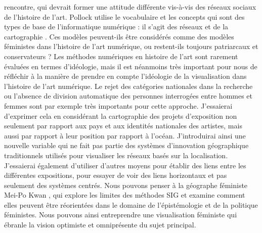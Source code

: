 \documentclass[a4paper, twoside, 12pt]{book}
\begin{document}
rencontre, qui devrait former une attitude différente vis-à-vis des réseaux sociaux de l'histoire de l'art. Pollock utilise le vocabulaire et les concepts qui sont des types de base de l'informatique numérique : il s'agit des réseaux et de la cartographie . Ces modèles peuvent-ils être considérés comme des modèles féministes dans l'histoire de l'art numérique, ou restent-ils toujours patriarcaux et conservateurs ? Les méthodes numériques en histoire de l'art sont rarement évaluées en termes d'idéologie, mais il est néanmoins très important pour nous de réfléchir à la manière de prendre en compte l'idéologie de la visualisation dans l'histoire de l'art numérique. Le rejet des catégories nationales dans la recherche ou l'absence de division automatique des personnes interrogées entre hommes et femmes sont par exemple très importants pour cette approche. J'essaierai d'exprimer cela en considérant la cartographie des projets d'exposition non seulement par rapport aux pays et aux identités nationales des artistes, mais aussi par rapport à leur position par rapport à l'océan. J'introduirai ainsi une nouvelle variable qui ne fait pas partie des systèmes d'innovation géographique traditionnels utilisés pour visualiser les réseaux basés sur la localisation. J'essaierai également d'utiliser d'autres moyens pour établir des liens entre les différentes expositions, pour essayer de voir des liens horizontaux et pas seulement des systèmes centrés. Nous pouvons penser à la géographe féministe Mei-Po Kwan , qui explore les limites des méthodes SIG et examine comment elles peuvent être réorientées dans le domaine de l'épistémologie et de la politique féministes. Nous pouvons ainsi entreprendre une visualisation féministe qui ébranle la vision optimiste et omniprésente du sujet principal. 
\end{document}
